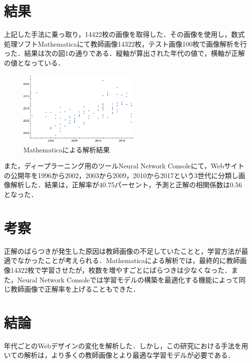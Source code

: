 \documentclass[uplatex,twocolumn,dvipdfmx]{jsarticle}
\begin{document}
\section{結果}

上記した手法に乗っ取り，14422枚の画像を取得した．その画像を使用し，数式処理ソフトMathematicaにて教師画像14322枚，テスト画像100枚で画像解析を行った．結果は次の図1の通りである．縦軸が算出された年代の値で，横軸が正解の値となっている．\vspace{0.2in} \\

\vspace{-1zh}
\begin{figure}[htb]
\centering
\includegraphics[width=6cm,clip]{graph.pdf}
\caption{Mathematicaによる解析結果}
\end{figure}
\vspace{-1zh}

また，ディープラーニング用のツールNeural Network Consoleにて，Webサイトの公開年を1996から2002，2003から2009，2010から2017という3世代に分類し画像解析した．結果は，正解率が40.75パーセント，予測と正解の相関係数は0.56となった．

\section{考察}

正解のばらつきが発生した原因は教師画像の不足していたことと，学習方法が最適でなかったことが考えられる．Mathematicaによる解析では，最終的に教師画像14322枚で学習させたが，枚数を増やすごとにばらつきは少なくなった．また，Neural Network Consoleでは学習モデルの構築を最適化する機能によって同じ教師画像で正解率を上げることもできた．

\section{結論}

年代ごとのWebデザインの変化を解析した．しかし，この研究における手法を用いての解析は，より多くの教師画像とより最適な学習モデルが必要である．


\end{document}
